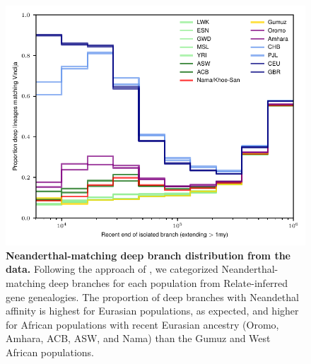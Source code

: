 \documentclass[]{article}
\begin{document}
\begin{figure}[ht]
    \centering
    \includegraphics{figures/supp-deep-brances-data}
    \caption{
        \textbf{Neanderthal-matching deep branch distribution from the data.}
        Following the approach of \citet{Speidel2019-nj}, we categorized
        Neanderthal-matching deep branches for each population from
        Relate-inferred gene genealogies. The proportion of deep branches with
        Neandethal affinity is highest for Eurasian populations, as expected,
        and higher for African populations with recent Eurasian ancestry
        (Oromo, Amhara, ACB, ASW, and Nama) than the Gumuz and West African
        populations. 
    }
    \label{fig:supp-deep-branches}
\end{figure}
\end{document}
